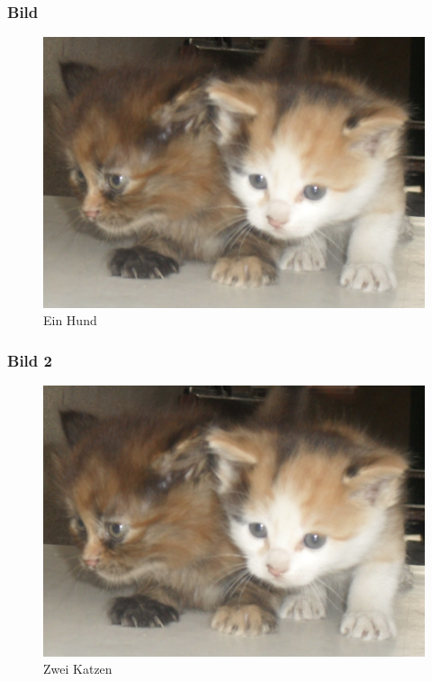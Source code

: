 \begin{frame}

\frametitle{Bild}
\label{bild}

\begin{figure}[htbp]
\centering
\includegraphics[keepaspectratio,width=\textwidth,height=0.75\textheight]{bild.jpg}
\caption{Ein Hund}
\label{}
\end{figure}


\end{frame}

\begin{frame}

\frametitle{Bild 2}
\label{bild2}

\begin{figure}[htbp]
\centering
\includegraphics[keepaspectratio,width=\textwidth,height=0.75\textheight]{bild.jpg}
\caption{Zwei Katzen}
\label{}
\end{figure}


\end{frame}

